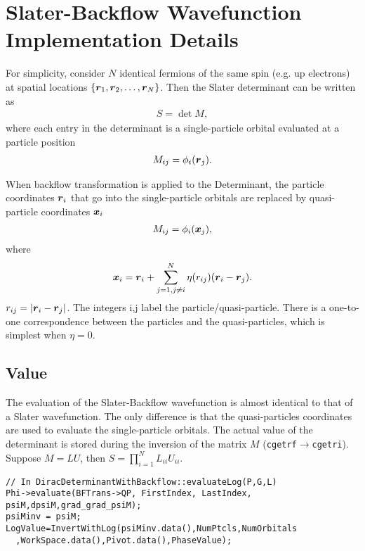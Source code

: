 \section{Slater-Backflow Wavefunction Implementation Details}

For simplicity, consider $N$ identical fermions of the same spin (e.g. up electrons) at spatial locations $\{\boldsymbol{r}_1,\boldsymbol{r}_2,\dots,\boldsymbol{r}_{N}\}$. Then the Slater determinant can be written as
\begin{align}
S=\det M,
\end{align}
where each entry in the determinant is a single-particle orbital evaluated at a particle position
\begin{align}
M_{ij} = \phi_i(\boldsymbol{r}_j).
\end{align}

When backflow transformation is applied to the Determinant, the particle coordinates $\boldsymbol{r}_i$ that go into the single-particle orbitals are replaced by quasi-particle coordinates $\boldsymbol{x}_i$
\begin{align}
M_{ij} = \phi_i(\boldsymbol{x}_j), \label{eq:psiM}
\end{align}
where
\begin{align}
\boldsymbol{x}_i=\boldsymbol{r}_i+\sum\limits_{j=1,j\neq i}^N\eta(r_{ij})(\boldsymbol{r}_i-\boldsymbol{r}_j). \label{eq:quasi}
\end{align}
$r_{ij}=\vert\boldsymbol{r}_i-\boldsymbol{r}_j\vert$. The integers i,j label the particle/quasi-particle. There is a one-to-one correspondence between the particles and the quasi-particles, which is simplest when $\eta=0$.

\subsection{Value}
The evaluation of the Slater-Backflow wavefunction is almost identical to that of a Slater wavefunction. The only difference is that the quasi-particles coordinates are used to evaluate the single-particle orbitals. The actual value of the determinant is stored during the inversion of the matrix $M$ (\verb|cgetrf|$\rightarrow$\verb|cgetri|). Suppose $M=LU$, then $S=\prod\limits_{i=1}^N L_{ii} U_{ii}$. \\

\begin{lstlisting}
// In DiracDeterminantWithBackflow::evaluateLog(P,G,L)
Phi->evaluate(BFTrans->QP, FirstIndex, LastIndex, psiM,dpsiM,grad_grad_psiM);
psiMinv = psiM;
LogValue=InvertWithLog(psiMinv.data(),NumPtcls,NumOrbitals
  ,WorkSpace.data(),Pivot.data(),PhaseValue);
\end{lstlisting}


